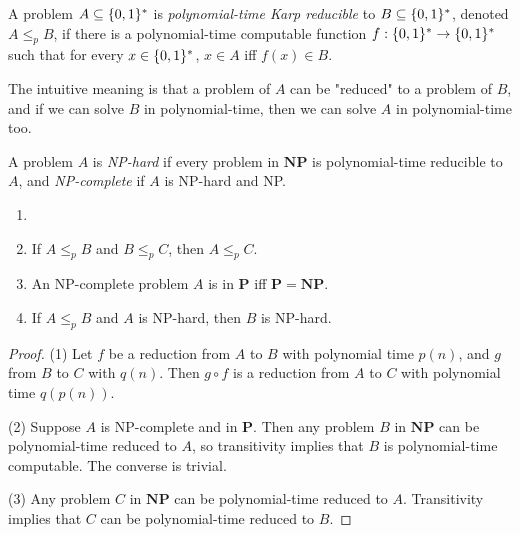         \begin{defn} \label{def_poly_karp}
            A problem $A \subseteq \{0,1\}^\ast$ is \emph{polynomial-time Karp reducible} to $B \subseteq \{0,1\}^\ast$, denoted $A \leq_p B$, if there is a polynomial-time computable function $f: \{0,1\}^\ast \rightarrow \{0,1\}^\ast$ such that for every $x \in \{0,1\}^\ast$, $x \in A$ iff $f(x) \in B$.
        \end{defn}
        
        The intuitive meaning is that a problem of $A$ can be "reduced" to a problem of $B$, and if we can solve $B$ in polynomial-time, then we can solve $A$ in polynomial-time too.
        
        \begin{defn}[NP-complete] \label{def_npc}
            A problem $A$ is \emph{NP-hard} if every problem in $\mathbf{NP}$ is polynomial-time reducible to $A$, and \emph{NP-complete} if $A$ is NP-hard and NP.
        \end{defn}
        
        \begin{thm} \label{thm_leqp_transitive}
            \begin{enumerate}
                \item[]
                \item If $A \leq_p B$ and $B \leq_p C$, then $A \leq_p C$.
                \item An NP-complete problem $A$ is in $\mathbf{P}$ iff $\mathbf{P}=\mathbf{NP}$.
                \item If $A \leq_p B$ and $A$ is NP-hard, then $B$ is NP-hard.
            \end{enumerate}
        \end{thm}
        
        \begin{proof}
            (1) Let $f$ be a reduction from $A$ to $B$ with polynomial time $p(n)$, and $g$ from $B$ to $C$ with $q(n)$. Then $g \circ f$ is a reduction from $A$ to $C$ with polynomial time $q(p(n))$.
            
            (2) Suppose $A$ is NP-complete and in $\mathbf{P}$. Then any problem $B$ in $\mathbf{NP}$ can be polynomial-time reduced to $A$, so transitivity implies that $B$ is polynomial-time computable. The converse is trivial.
            
            (3) Any problem $C$ in $\mathbf{NP}$ can be polynomial-time reduced to $A$. Transitivity implies that $C$ can be polynomial-time reduced to $B$.
        \end{proof}
        

